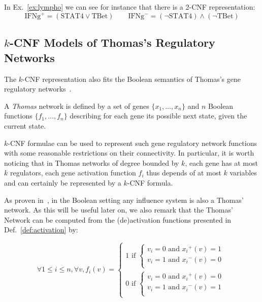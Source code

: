 \documentclass{llncs}
\begin{document}
\begin{example}
   In Ex.~\ref{ex:lympho} we can see for instance that there is a 2-CNF
   representation:
   \[\text{IFNg}^+=(\text{STAT4}\vee \text{TBet})\qquad
   \text{IFNg}^-=(\neg \text{STAT4})\wedge(\neg \text{TBet})\]
\end{example}

\subsection{$k$-CNF Models of Thomas's Regulatory Networks}

The $k$-CNF representation also fits the Boolean semantics of Thomas's gene
regulatory networks~\cite{Thomas73jtb}.

\begin{definition}
   A \emph{Thomas} network is defined by a set of genes $\{x_1,\dots,x_n\}$
   and $n$ Boolean functions $\{f_1,\dots,f_n\}$ describing for each gene its
   possible next state, given the current state.
\end{definition}

$k$-CNF formulae can be used to represent such gene regulatory network functions with some reasonable restrictions on their connectivity.
In particular, it is worth noticing that in Thomas networks of degree bounded by $k$,
each gene has at most $k$ regulators, each gene activation function $f_i$ thus depends of at most $k$ variables
and can certainly be represented by a $k$-CNF formula.

As proven in~\cite{FMRS16cmsb}, in the Boolean setting any influence system is
also a Thomas' network.
As this will be useful later on, we also remark that the Thomas' Network can
be computed from the (de)activation functions presented in Def.~\ref{def:activation} by:

\[
\forall 1 \leq i \leq n, \forall v, f_i(v) = \left\{\begin{array}{l}
1 \text{ if } \left\{\begin{array}{l}
v_i = 0 \text{ and } {x_i}^+(v) = 1\\
v_i = 1 \text{ and } {x_i}^-(v) = 0 \\
\end{array}\right.\\[1em]
0 \text{ if } \left\{\begin{array}{l}
v_i = 0 \text{ and } {x_i}^+(v) = 0\\
v_i = 1 \text{ and } {x_i}^-(v) = 1\\
\end{array}\right.
\end{array}\right.
\]
\end{document}
